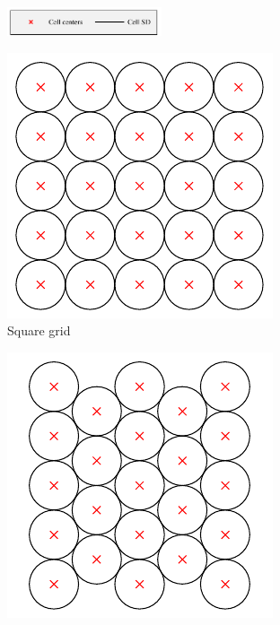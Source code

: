 \documentclass[thesis.tex]{subfiles}
\begin{document}
\begin{figure}
	\centering
	\begin{subfigure}[t]{\textwidth}
		\centering
		\includegraphics[width=0.5\textwidth]{img/gridType_legend_cropped.pdf}
	\end{subfigure}
	\begin{subfigure}[t]{0.45\textwidth}
		\includegraphics[width=\textwidth]{img/gridType_square_window.pdf}
		\caption{Square grid}
		\label{fig:gridTypeSquare}
	\end{subfigure}
	\begin{subfigure}[t]{0.45\textwidth}
		\includegraphics[width=\textwidth]{img/gridType_triangle_window.pdf}

\end{subfigure}
\end{figure}
\end{document}
